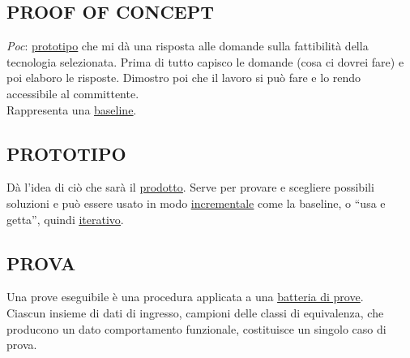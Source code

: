 		\subsection{PROOF OF CONCEPT}	 \label{poc}
		\textit{Poc}: \underline{\hyperref[prototipo]{prototipo}} che mi dà una risposta alle domande sulla fattibilità  della tecnologia selezionata. Prima di tutto capisco le domande (cosa ci dovrei fare) e poi elaboro le risposte. Dimostro poi che il lavoro si può fare e lo rendo accessibile al committente. \\
		Rappresenta una \underline{\hyperref[baseline]{baseline}}.

		\subsection{PROTOTIPO}  \label{prototipo}
		Dà l'idea di ciò che sarà il \underline{\hyperref[prodotto]{prodotto}}. Serve per provare e scegliere possibili soluzioni e può essere usato in modo \underline{\hyperref[incremento]{incrementale}} come la baseline, o ``usa e getta'', quindi \underline{\hyperref[iterazione]{iterativo}}.

		\subsection{PROVA}		\label{prova} %
		Una prove eseguibile è una procedura applicata a una \underline{\hyperref[testsuite]{batteria di prove}}. \\
		Ciascun insieme di dati di ingresso, campioni delle classi di equivalenza, che producono un dato comportamento funzionale, costituisce un singolo caso di prova.
